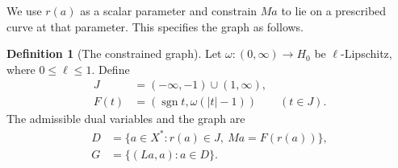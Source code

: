 \documentclass[11pt]{article}
\newcommand{\sgn}{\operatorname{sgn}}
\theoremstyle{definition}
\newtheorem{definition}{Definition}
\theoremstyle{remark}
\begin{document}
We use $r(a)$ as a scalar parameter and constrain $Ma$ to lie on a
prescribed curve at that parameter. This specifies the graph as follows. 

\begin{definition}[The constrained graph]
\label{def:construction-graph}
Let $\omega:(0,\infty)\to H_0$ be $\ell$-Lipschitz, where
$0\le\ell\le1$. Define
\[
\begin{aligned}
J&=(-\infty,-1)\cup(1,\infty),\\
F(t)&=(\sgn t,\omega(|t|-1))\qquad(t\in J).
\end{aligned}
\]
The admissible dual variables and the graph are
\begin{equation}
\begin{aligned}
D&=\{a\in X^*:r(a)\in J,\ Ma=F(r(a))\},\\
G&=\{(La,a):a\in D\}.
\end{aligned}
\label{eq:abs-full-graph}
\end{equation}
\end{definition}
\end{document}
